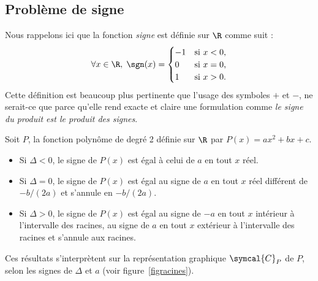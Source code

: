 \subsection{Problème de signe}
Nous rappelons ici que la fonction \emph{signe} est définie sur $\R$ comme suit :
\[\forall x \in \R,\; \sgn(x)=\begin{cases}
-1 &\text{si $x<0$,}\\
0 &\text{si $x=0$,}\\
1 &\text{si $x>0$.}
\end{cases}
\]
Cette définition est beaucoup plus pertinente que l'usage des symboles ${+}$ et ${-}$, ne serait-ce que parce qu'elle rend exacte et claire une formulation comme \emph{le signe du produit est le produit des signes}.
\begin{thm}
Soit $P$, la fonction polynôme de degré 2 définie sur $\R$ par $P(x)=ax^2+bx+c$. 
\begin{itemize}
\item  Si $\Delta<0$,  le signe de $P(x)$ est égal à celui de $a$ en tout $x$ réel.
\item  Si $\Delta=0$, le signe de $P(x)$ est égal au signe de $a$ en tout $x$ réel différent de $-b/(2a)$ et s'annule en $-b/(2a)$.
\item  Si $\Delta>0$, le signe de $P(x)$ est égal au signe de $-a$ en tout $x$ intérieur à l'intervalle des racines, au signe de $a$ en tout $x$ extérieur à l'intervalle des racines et s'annule aux racines. 
\end{itemize}
\label{thsgn}
\end{thm}

Ces résultats s'interprètent sur la représentation graphique $\symcal{C}_P$ de $P$, selon les signes de $\Delta$ et $a$ (voir figure \ref{figracines}).
\afterpage{\clearpage\begin{figure}[H]\centering
\AfourCommand{%
\noindent\hfill\paraone\hfill\parathree\hfill\parafive\hfill\null
\par
\noindent\hfill\paratwo\hfill\parafour\hfill\parasix\hfill\null
}
\BigTabletCommand{%
\noindent\hfill\paraone\hfill\parathree\hfill\parafive\hfill\null
\par
\noindent\hfill\paratwo\hfill\parafour\hfill\parasix\hfill\null
}
\TabletCommand{%
\noindent\hfill\paraone\hfill\parathree\hfill\parafive\hfill\null
\par
\noindent\hfill\paratwo\hfill\parafour\hfill\parasix\hfill\null
}
\SmartphoneCommand{%
\noindent\hfill\paraone\hfill\paratwo\hfill\null
\par
\noindent\hfill\parathree\hfill\parafour\hfill\null
\par
\noindent\hfill\parafive\hfill\parasix\hfill\null
}
\SmallTabletCommand{%
\vspace*{1.5cm}\par
\noindent\hfill\paraone\hfill\paratwo\hfill\null
\par
\noindent\hfill\parathree\hfill\parafour\hfill\null
\par
\noindent\hfill\parafive\hfill\parasix\hfill\null
}
\figcaption{}\label{figracines}
\end{figure}
}

